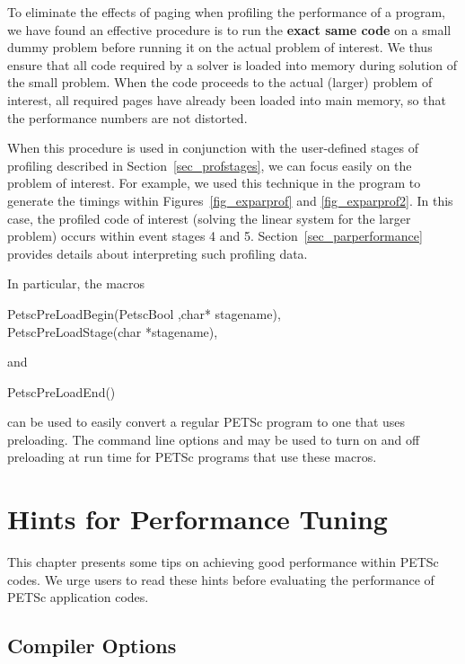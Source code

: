 {{To eliminate the effects of paging when profiling the performance of a
program, we have found an effective procedure is to run the {\bf exact same
code} on a small dummy problem before running it on the actual problem
of interest. We thus ensure that all code required by a solver is
loaded into memory during solution of the small problem.  When the
code proceeds to the actual (larger) problem of interest, all required
pages have already been loaded into main memory, so that the
performance numbers are not distorted.

When this procedure is used in conjunction with the user-defined stages of profiling
described in Section~\ref{sec_profstages}, we can focus easily on the
problem of interest.  For example, we used this technique in the program
 to
generate the timings within Figures~\ref{fig_exparprof} and \ref{fig_exparprof2}.
In this case,
the profiled code of interest (solving the linear system for the larger problem)
occurs within event stages 4 and 5.  Section~\ref{sec_parperformance} provides
details about interpreting such profiling data.

In particular, the macros
\begin{tabbing}
  PetscPreLoadBegin(PetscBool ,char* stagename),\\
  PetscPreLoadStage(char *stagename),
\end{tabbing}
and
\begin{tabbing}
  PetscPreLoadEnd()
\end{tabbing}
can be used to easily
convert a regular PETSc program to one that uses preloading. The command line options
  and   may be used to turn on and off
preloading at run time for PETSc programs that use these macros. 

\cleardoublepage
\chapter{Hints for Performance Tuning}
\label{ch_performance} \hypertarget{ch_performance}{}

This chapter presents some tips on achieving good performance within
PETSc codes.  We urge users to read these hints before
evaluating the performance of PETSc application codes.

\section{Compiler Options}


}}
